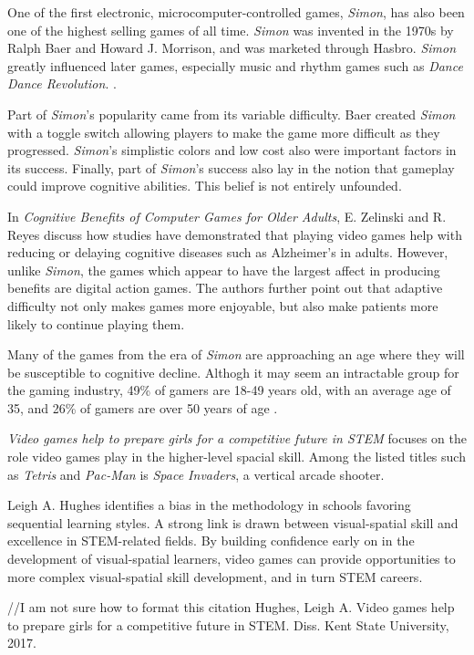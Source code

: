 One of the first electronic, microcomputer-controlled games, \textit{Simon},
has also been one of the highest selling games of all time.  \textit{Simon}
was invented in the 1970s by Ralph Baer and Howard J. Morrison, and
was marketed through Hasbro.  \textit{Simon} greatly influenced later games,
especially music and rhythm games such as \textit{Dance Dance Revolution}.
\citep{austin2016}.

Part of \textit{Simon}'s popularity came from its variable difficulty.  Baer
created \textit{Simon} with a toggle switch allowing players to make the game
more difficult as they progressed.  \textit{Simon}'s simplistic colors and low
cost also were important factors in its success.  Finally, part of
\textit{Simon}'s success also lay in the notion that gameplay could improve
cognitive abilities.  This belief is not entirely unfounded.

In \textit{Cognitive Benefits of Computer Games for Older Adults},
E. Zelinski and R. Reyes discuss how studies have demonstrated that playing video
games help with reducing or delaying cognitive diseases such as
Alzheimer’s in adults.  However, unlike \textit{Simon}, the games which appear
to have the largest affect in producing benefits are digital action games.
The authors further point out that adaptive difficulty not only makes
games more enjoyable, but also make patients more likely to continue
playing them.

Many of the games from the era of \textit{Simon} are approaching an age
where they will be susceptible to cognitive decline.  Althogh it
may seem an intractable group for the gaming industry, 49\% of gamers
are 18-49 years old, with an average age of 35, and 26\% of gamers are
over 50 years of age \citep{zelinski2009}.

\textit{Video games help to prepare girls for a competitive future in STEM} focuses on
the role video games play in the higher-level spacial skill. Among the listed
titles such as \textit{Tetris} and \textit{Pac-Man} is \textit{Space Invaders}, 
a vertical arcade shooter.\citep{Hughes2017}

Leigh A. Hughes identifies a bias in the methodology in schools favoring 
sequential learning styles. A strong link is drawn between visual-spatial skill
and excellence in STEM-related fields. By building confidence early on in the
development of visual-spatial learners, video games can provide opportunities
to more complex visual-spatial skill development, and in turn STEM careers.

//I am not sure how to format this citation
Hughes, Leigh A. Video games help to prepare girls for a competitive future in STEM. Diss. Kent State University, 2017.

